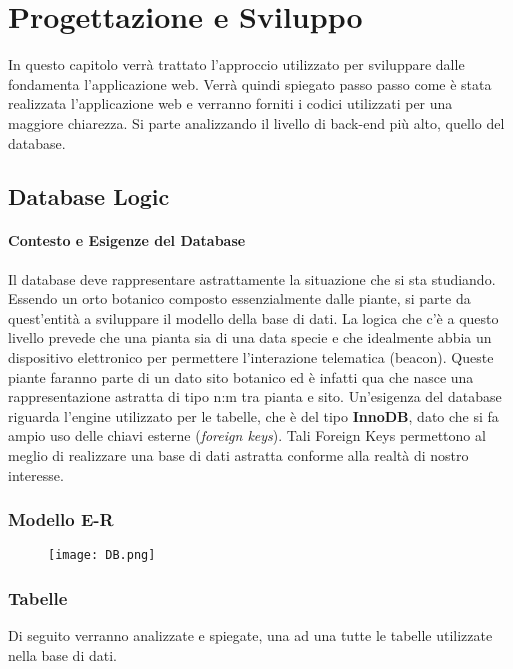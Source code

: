 \chapter{Progettazione e Sviluppo}

In questo capitolo verrà trattato l'approccio utilizzato per sviluppare dalle fondamenta l'applicazione web. Verrà quindi spiegato passo passo come è stata realizzata l'applicazione web e verranno forniti i codici utilizzati per una maggiore chiarezza. \newline
Si parte analizzando il livello di back-end più alto, quello del database.
\section{Database Logic}

\subsubsection{Contesto e Esigenze del Database}
Il database deve rappresentare astrattamente la situazione che si sta studiando. Essendo un orto botanico composto essenzialmente dalle piante, si parte da quest'entità a sviluppare il modello della base di dati.
La logica che c'è a questo livello prevede che una pianta sia di una data specie e che idealmente abbia un dispositivo elettronico per permettere l'interazione telematica (beacon). Queste piante faranno parte di un dato sito botanico ed è infatti qua che nasce una rappresentazione astratta di tipo n:m tra pianta e sito. \newline
Un'esigenza del database riguarda l'engine utilizzato per le tabelle, che è del tipo \textbf{InnoDB}, dato che si fa ampio uso delle chiavi esterne (\textit{foreign keys}).
Tali Foreign Keys permettono al meglio di realizzare una base di dati astratta conforme alla realtà di nostro interesse.
\newline 




\subsection{Modello E-R}
\begin{figure}[H]
	\centering
	\texttt{[image: DB.png]}
\end{figure}




\subsection{Tabelle}
Di seguito verranno analizzate e spiegate, una ad una tutte le tabelle utilizzate nella base di dati.

